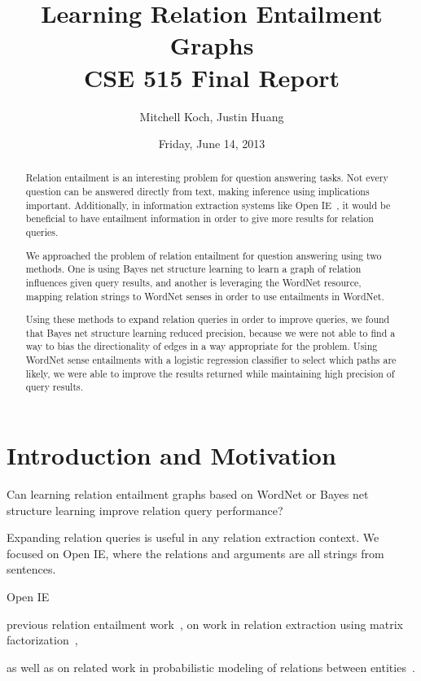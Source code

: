 \documentclass{article}
\author{Mitchell Koch, Justin Huang}
\title{Learning Relation Entailment Graphs\\CSE 515 Final Report}
\date{Friday, June 14, 2013}
\begin{document}
\maketitle

\begin{abstract}
Relation entailment is an interesting problem for question answering tasks. Not every question can be answered directly from text, making inference using implications important. Additionally, in information extraction systems like Open IE~\cite{Etzioni:2008:OIE:1409360.1409378}, it would be beneficial to have entailment information in order to give more results for relation queries.

We approached the problem of relation entailment for question answering using two methods. One is using Bayes net structure learning to learn a graph of relation influences given query results, and another is leveraging the WordNet resource, mapping relation strings to WordNet senses in order to use entailments in WordNet.

Using these methods to expand relation queries in order to improve queries, we found that Bayes net structure learning reduced precision, because we were not able to find a way to bias the directionality of edges in a way appropriate for the problem. Using WordNet sense entailments with a logistic regression classifier to select which paths are likely, we were able to improve the results returned while maintaining high precision of query results. %
\end{abstract}

\section{Introduction and Motivation}

Can learning relation entailment graphs based on WordNet or Bayes net
structure learning improve relation query performance?

Expanding relation queries is useful in any relation extraction context. We focused on Open IE, where the relations and arguments are all strings from sentences.

Open IE~\cite{Etzioni:2008:OIE:1409360.1409378}

previous relation entailment
work~\cite{Berant:2012:LER:2122944.2122947, berant2011global}, on work in relation
extraction using matrix factorization~\cite{riedel13relation}, 

as well as on related work in probabilistic modeling of relations
between entities~\cite{TaskarWAK03, Taskar:2002:DPM:2073876.2073934}.
\end{document}
